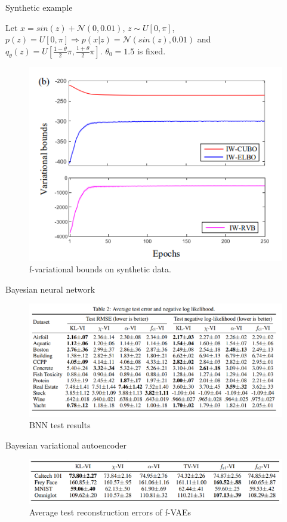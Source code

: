 \documentclass{beamer}
\begin{document}
\begin{frame}{Synthetic example}
    \begin{block}{}
        Let $x = sin(z) + \mathcal{N}(0, 0.01)$, $z \sim U[0, \pi]$, $p(z)=U[0, \pi] \Rightarrow p(x|z)=\mathcal{N}(sin(z), 0.01)$ and $q_\theta(z)=U\left[\frac{1-\theta}{2}\pi, \frac{1+\theta}{2}\pi\right]$. $\theta_0=1.5$ is fixed.

        \begin{figure}
            \centering
            \includegraphics[scale=0.5]{fig1.PNG}
            \caption{f-variational bounds on synthetic data.}
            \label{fig:fig1}
        \end{figure}
    \end{block}
\end{frame}

\begin{frame}{Bayesian neural network}
    \begin{block}{}
        \begin{figure}
            \centering
            \includegraphics[scale=0.4]{fig2.PNG}
            \caption{BNN test results}
            \label{fig:fig2}
        \end{figure}
    \end{block}
\end{frame}

\begin{frame}{Bayesian variational autoencoder}
    \begin{figure}
        \centering
        \includegraphics[scale=0.4]{fig3.PNG}
        \caption{Average test reconstruction errors of f-VAEs}
        \label{fig:my_label}
    \end{figure}
\end{frame}
\end{document}
